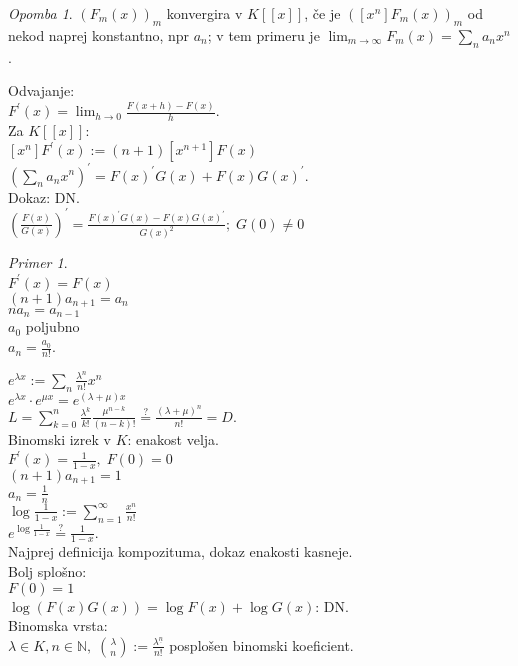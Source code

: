\documentclass[a4paper, 12pt]{book}
\theoremstyle{definition}
\theoremstyle{remark}
\newtheorem*{ex}{Primer}
\newtheorem*{rem}{Opomba}
\newcommand{\N}{\mathbb{N}}
\begin{document}
\begin{rem}
  $(F_m(x))_m$ konvergira v $K[[x]]$, če je $([x^n] F_m(x))_m$ od nekod naprej konstantno, npr $a_n$;
  v tem primeru je $\lim_{m \to \infty} F_m(x) = \sum_n a_n x^n$.
\end{rem}



Odvajanje: \\
$F^{'}(x) = \lim_{h \to 0} \frac{F(x+h) - F(x)}{h}$. \\
Za $K[[x]]:$ \\
$[x^n] F^{'}(x) := (n+1) [x^{n+1}] F(x)$ \\
$(\sum_n a_n x^n)^{'} = F(x)^{'} G(x) + F(x) G(x)^{'}$. \\
Dokaz: DN. \\
$\left(\frac{F(x)}{G(x)}\right)^{'} = \frac{F(x)^{'} G(x) - F(x) G(x)^{'}}{G(x)^2}; \; G(0) \neq 0$
\begin{ex} \text{} \\
  $F^{'}(x) = F(x)$ \\
  $(n+1) a_{n+1} = a_n$ \\
  $n a_n = a_{n-1}$ \\
  $a_0$ poljubno \\
  $a_n = \frac{a_0}{n!}$.
\end{ex}
$e^{\lambda x} := \sum_n \frac{\lambda^n}{n!} x^n$ \\
$e^{\lambda x} \cdot e^{\mu x} = e^{(\lambda + \mu) x}$ \\
$L = \sum_{k=0}^{n} \frac{\lambda^k}{k!} \frac{\mu^{n-k}}{(n-k)!} \stackrel{?}{=} \frac{(\lambda+\mu)^n}{n!} = D$. \\
Binomski izrek v $K$: enakost velja. \\
$F^{'}(x) = \frac{1}{1-x}, \; F(0) = 0$ \\
$(n+1) a_{n+1} = 1$ \\
$a_n = \frac{1}{n}$ \\
$\log \frac{1}{1-x} := \sum_{n=1}^{\infty} \frac{x^n}{n!}$ \\
$e^{\log \frac{1}{1-x}} \stackrel{?}{=} \frac{1}{1-x}$. \\
Najprej definicija kompozituma, dokaz enakosti kasneje. \\
Bolj splošno: \\
$F(0) = 1$ \\
$\log (F(x) G(x)) = \log F(x) + \log G(x)$: DN. \\
Binomska vrsta: \\
$\lambda \in K, n \in \N, \; \binom{\lambda}{n} := \frac{\lambda^{\underline{n}}}{n!}$ posplošen binomski koeficient. \\
\end{document}
